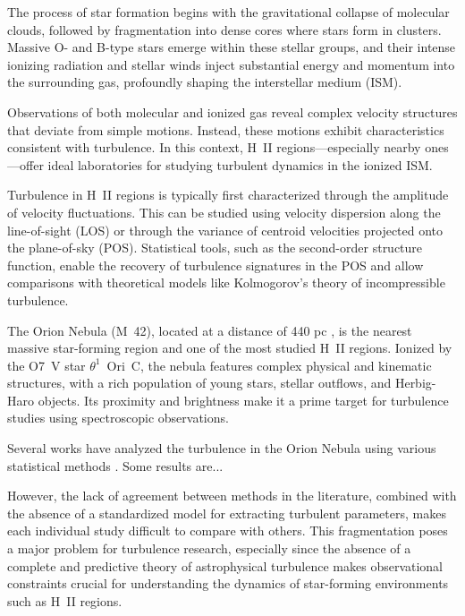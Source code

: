 \documentclass[fleqn,usenatbib, useAMS, a4paper]{mnras}
\begin{document}
The process of star formation begins with the gravitational collapse of molecular clouds, followed by fragmentation into dense cores where stars form in clusters. 
Massive O- and B-type stars emerge within these stellar groups, and their intense ionizing radiation and stellar winds inject substantial energy and momentum into the surrounding gas, profoundly shaping the interstellar medium (ISM).

Observations of both molecular and ionized gas reveal complex velocity structures that deviate from simple motions. 
Instead, these motions exhibit characteristics consistent with turbulence. 
In this context, H~II regions—especially nearby ones—offer ideal laboratories for studying turbulent dynamics in the ionized ISM.

Turbulence in H~II regions is typically first characterized through the amplitude of velocity fluctuations. This can be studied using velocity dispersion along the line-of-sight (LOS) or through the variance of centroid velocities projected onto the plane-of-sky (POS). 
Statistical tools, such as the second-order structure function, enable the recovery of turbulence signatures in the POS and allow comparisons with theoretical models like Kolmogorov’s theory of incompressible turbulence.



The Orion Nebula (M~42), located at a distance of 440 pc \citetext{\SI{1}{\arcsecond} = \SI{0.002}{pc}; \citealp{2008AJ....136.1566O}}, is the nearest massive star-forming region and one of the most studied H~II regions. 
Ionized by the O7~V star $\theta^1$~Ori~C, the nebula features complex physical and kinematic structures, with a rich population of young stars, stellar outflows, and Herbig-Haro objects. 
Its proximity and brightness make it a prime target for turbulence studies using spectroscopic observations.

Several works have analyzed the turbulence in the Orion Nebula using various statistical methods \citep{von1951methode, munch1958internal, castaneda1988, 1992ApJ...387..229O, 2016MNRAS.455.4057M, arthur2016turbulence, 2016MNRAS.455.4057M}. 
Some results are...


However, the lack of agreement between methods in the literature, combined with the absence of a standardized model for extracting turbulent parameters, makes each individual study difficult to compare with others. 
This fragmentation poses a major problem for turbulence research, especially since the absence of a complete and predictive theory of astrophysical turbulence makes observational constraints crucial for understanding the dynamics of star-forming environments such as H~II regions.
\end{document}
